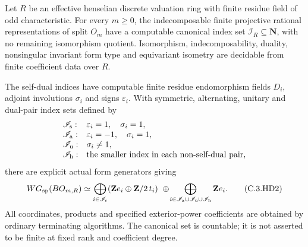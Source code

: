 \begin{theorem}
\label{C:effective-henselian-DVR-WG}
Let $R$ be an effective henselian discrete valuation ring
with finite residue field of odd characteristic.
For every $m\geq0$, the indecomposable finite projective
rational representations of split $O_m$ have a computable
canonical index set $\mathscr I_R\subseteq\mathbf N$,
with no remaining isomorphism quotient.  Isomorphism,
indecomposability, duality, nonsingular invariant form
type and equivariant isometry are decidable from finite
coefficient data over $R$.

The self-dual indices have computable finite residue
endomorphism fields $D_i$, adjoint involutions $\sigma_i$
and signs $\varepsilon_i$.  With symmetric, alternating,
unitary and dual-pair index sets defined by
\[
 \begin{array}{ll}
 \mathscr I_{\rm s}:&\varepsilon_i=1,\quad\sigma_i=1,\\
 \mathscr I_{\rm a}:&\varepsilon_i=-1,\quad\sigma_i=1,\\
 \mathscr I_{\rm u}:&\sigma_i\ne1,\\
 \mathscr I_{\rm h}:&\text{the smaller index in each non-self-dual pair},
 \end{array}
\]
there are explicit actual form generators giving
\[
 WG_{\rm sp}(BO_{m,R})\simeq
 \bigoplus_{i\in\mathscr I_{\rm s}}
       (\mathbf Z e_i\oplus\mathbf Z/2\,t_i)
 \ \oplus\!
 \bigoplus_{i\in\mathscr I_{\rm a}\cup\mathscr I_{\rm u}
                           \cup\mathscr I_{\rm h}}
       \mathbf Z e_i.                                    \tag{C.3.HD2}
\]
All coordinates, products and specified exterior-power
coefficients are obtained by ordinary terminating algorithms.
The canonical set is countable; it is not asserted to be
finite at fixed rank and coefficient degree.
\end{theorem}
